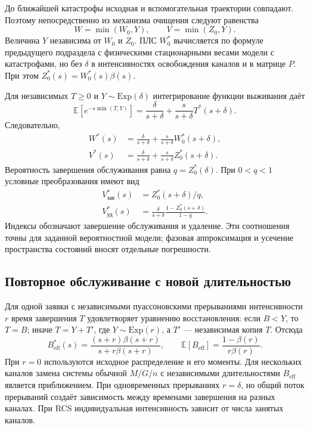 До ближайшей катастрофы исходная и вспомогательная траектории совпадают. Поэтому непосредственно из механизма очищения следуют равенства
\[
W=\min(W_0,Y),\qquad V=\min(Z_0,Y).
\]
Величина \(Y\) независима от \(W_0\) и \(Z_0\). ПЛС \(W_0^*\) вычисляется по формуле предыдущего подраздела с физическими стационарными весами модели с катастрофами, но без \(\delta\) в интенсивностях освобождения каналов и в матрице \(P\). При этом \(Z_0^*(s)=W_0^*(s)\beta(s)\).

Для независимых \(T\ge0\) и \(Y\sim\mathrm{Exp}(\delta)\) интегрирование функции выживания даёт
\[
\mathbb E[e^{-s\min(T,Y)}]=\frac{\delta}{s+\delta}+\frac{s}{s+\delta}T^*(s+\delta).
\]
Следовательно,
\begin{align*}
W^*(s)&=\frac{\delta}{s+\delta}+\frac{s}{s+\delta}W_0^*(s+\delta),\\
V^*(s)&=\frac{\delta}{s+\delta}+\frac{s}{s+\delta}Z_0^*(s+\delta).
\end{align*}
Вероятность завершения обслуживания равна \(q=Z_0^*(\delta)\). При \(0<q<1\) условные преобразования имеют вид
\begin{align*}
V_{\text{зав}}^*(s)&=Z_0^*(s+\delta)/q,\\
V_{\text{уд}}^*(s)&=\frac{\delta}{s+\delta}\frac{1-Z_0^*(s+\delta)}{1-q}.
\end{align*}
Индексы обозначают завершение обслуживания и удаление. Эти соотношения точны для заданной вероятностной модели; фазовая аппроксимация и усечение пространства состояний вносят отдельные погрешности.

\subsection{Повторное обслуживание с новой длительностью}
Для одной заявки с независимыми пуассоновскими прерываниями интенсивности \(r\) время завершения \(T\) удовлетворяет уравнению восстановления: если \(B<Y\), то \(T=B\); иначе \(T=Y+T'\), где \(Y\sim\mathrm{Exp}(r)\), а \(T'\) --- независимая копия \(T\). Отсюда \cite{pal2017}
\[
B_{\mathrm{eff}}^*(s)=\frac{(s+r)\beta(s+r)}{s+r\beta(s+r)},\qquad
\mathbb E[B_{\mathrm{eff}}]=\frac{1-\beta(r)}{r\beta(r)}.
\]
При \(r=0\) используются исходное распределение и его моменты. Для нескольких каналов замена системы обычной \(M/G/n\) с независимыми длительностями \(B_{\mathrm{eff}}\) является приближением. При одновременных прерываниях \(r=\delta\), но общий поток прерываний создаёт зависимость между временами завершения на разных каналах. При RCS индивидуальная интенсивность зависит от числа занятых каналов.

